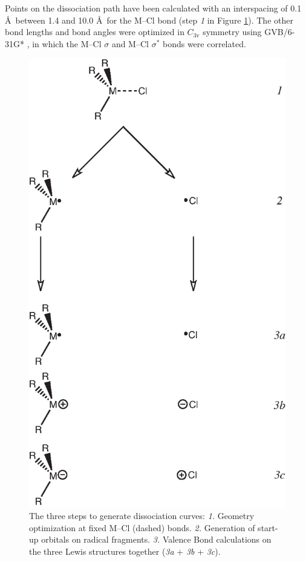 Points on the dissociation path have been calculated with an interspacing of 0.1 \AA\ between 1.4 and 10.0 \AA\ for the \mbox{M--Cl} bond  (step \textit{1} in Figure \ref{ch3.fig.scheme1}). The other bond lengths and bond angles were optimized in $C_\mathrm{3v}$ symmetry using \mbox{GVB/6-31G*} \cite{gvb1,gvb2,gvb3,gvb4}, in which the \mbox{M--Cl} $\sigma$ and \mbox{M--Cl} $\sigma^{*}$ bonds were correlated.
\begin{figure}[htb]
\begin{center}
\includegraphics{dissociation/figures/scheme1.eps}
\end{center}
\caption{The three steps to generate dissociation curves: \textit{1.} Geometry optimization at fixed M--Cl (dashed) bonds. \textit{2.} Generation of start-up orbitals on radical fragments. \textit{3.} Valence Bond calculations on the three Lewis structures together (\textit{3a} + \textit{3b} + \textit{3c}).} 
\label{ch3.fig.scheme1}
\end{figure}
